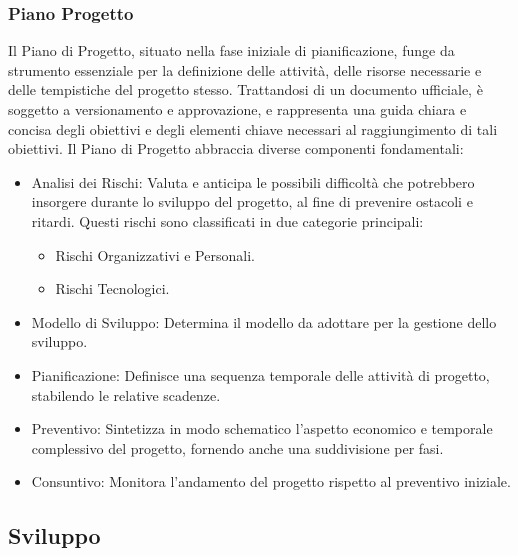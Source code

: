 \documentclass{article}
\begin{document}
\subsubsection{Piano Progetto}
Il Piano di Progetto, situato nella fase iniziale di pianificazione, funge da strumento essenziale per la definizione delle attività, delle risorse necessarie e delle tempistiche del progetto stesso. Trattandosi di un documento ufficiale, è soggetto a versionamento e approvazione, e rappresenta una guida chiara e concisa degli obiettivi e degli elementi chiave necessari al raggiungimento di tali obiettivi.
Il Piano di Progetto abbraccia diverse componenti fondamentali:
\begin{itemize}
    \item Analisi dei Rischi: Valuta e anticipa le possibili difficoltà che potrebbero insorgere durante lo sviluppo del progetto, al fine di prevenire ostacoli e ritardi. Questi rischi sono classificati in due categorie principali:
    \begin{itemize}
        \item Rischi Organizzativi e Personali.
        \item Rischi Tecnologici.
    \end{itemize}
    \item Modello di Sviluppo: Determina il modello da adottare per la gestione dello sviluppo.
    \item Pianificazione: Definisce una sequenza temporale delle attività di progetto, stabilendo le relative scadenze.
    \item Preventivo: Sintetizza in modo schematico l'aspetto economico e temporale complessivo del progetto, fornendo anche una suddivisione per fasi.
    \item Consuntivo: Monitora l'andamento del progetto rispetto al preventivo iniziale.
\end{itemize}


\subsection{Sviluppo}
\end{document}
